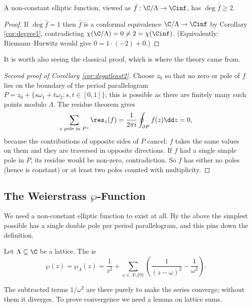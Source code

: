 \begin{corollary}\label{cor:degatleast2}
	A non-constant elliptic function, viewed as $\bar f : \C/\Lambda \to \Cinf$, has
	$\deg \bar f \geq 2$.
\end{corollary}

\begin{proof}
	If $\deg\bar f = 1$ then $\bar f$ is a conformal equivalence $\C/\Lambda \to \Cinf$ by
	Corollary \ref{cor:degree1}, contradicting $\chi(\C/\Lambda) = 0 \neq 2 = \chi(\Cinf)$.
	(Equivalently: Riemann--Hurwitz would give $0 = 1\cdot(-2) + 0$.)
\end{proof}

It is worth also seeing the classical proof, which is where the theory came from.

\begin{proof}[Second proof of Corollary \ref{cor:degatleast2}]
	Choose $z_0$ so that no zero or pole of $f$ lies on the boundary of the period
	parallelogram $P = z_0 + \{s\omega_1 + t\omega_2 : s,t\in[0,1]\}$; this is possible as
	there are finitely many such points modulo $\Lambda$. The residue theorem gives
	$$
	\sum_{z \text{ pole in } P^\circ} \res_z(f) = \frac{1}{2\pi i}\oint_{\partial P} f(z)\dd z = 0,
	$$
	because the contributions of opposite sides of $P$ cancel: $f$ takes the same values on
	them and they are traversed in opposite directions. If $f$ had a single simple pole in
	$P$, its residue would be non-zero, contradiction. So $f$ has either no poles (hence is
	constant) or at least two poles counted with multiplicity.
\end{proof}

\subsection{The Weierstrass $\wp$-Function}

We need a non-constant elliptic function to exist at all. By the above the simplest
possible has a single double pole per period parallelogram, and this pins down the
definition.

\begin{definition}
	Let $\Lambda \subseteq \C$ be a lattice. The  is
	$$
	\wp(z) = \wp_\Lambda(z) = \frac{1}{z^2} + \sum_{\omega \in \Lambda\setminus\{0\}}
	\left(\frac{1}{(z-\omega)^2} - \frac{1}{\omega^2}\right).
	$$
\end{definition}

The subtracted terms $1/\omega^2$ are there purely to make the series converge; without
them it diverges. To prove convergence we need a lemma on lattice sums.

